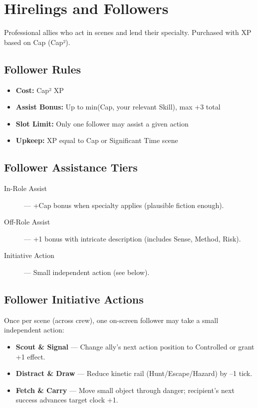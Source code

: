 \section{Hirelings and Followers}

Professional allies who act in scenes and lend their specialty. Purchased with XP based on Cap (Cap²).

\subsection*{Follower Rules}

\begin{itemize}
  \item \textbf{Cost:} Cap² XP
  \item \textbf{Assist Bonus:} Up to min(Cap, your relevant Skill), max +3 total
  \item \textbf{Slot Limit:} Only one follower may assist a given action
  \item \textbf{Upkeep:} XP equal to Cap or Significant Time scene
\end{itemize}

\subsection*{Follower Assistance Tiers}

\begin{description}
  \item[In-Role Assist] — +Cap bonus when specialty applies (plausible fiction enough).
  \item[Off-Role Assist] — +1 bonus with intricate description (includes Sense, Method, Risk).
  \item[Initiative Action] — Small independent action (see below).
\end{description}

\subsection*{Follower Initiative Actions}

Once per scene (across crew), one on-screen follower may take a small independent action:

\begin{itemize}
  \item \textbf{Scout \& Signal} — Change ally's next action position to Controlled or grant +1 effect.
  \item \textbf{Distract \& Draw} — Reduce kinetic rail (Hunt/Escape/Hazard) by –1 tick.
  \item \textbf{Fetch \& Carry} — Move small object through danger; recipient's next success advances target clock +1.
\end{itemize}

